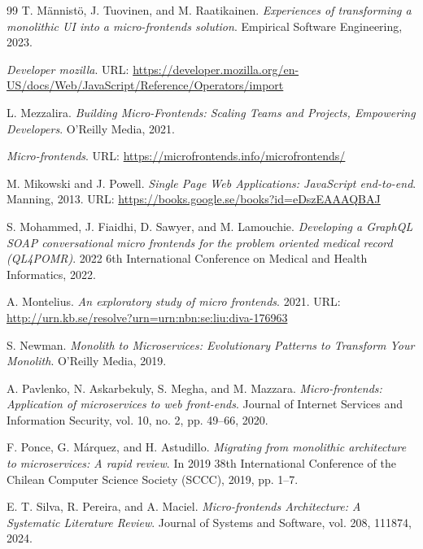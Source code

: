 \begin{thebibliography}{99}
    T. Männistö, J. Tuovinen, and M. Raatikainen.
    \textit{Experiences of transforming a monolithic UI into a micro-frontends solution}.
    Empirical Software Engineering, 2023.

    \textit{Developer mozilla}.
    URL: \url{https://developer.mozilla.org/en-US/docs/Web/JavaScript/Reference/Operators/import}

    L. Mezzalira.
    \textit{Building Micro-Frontends: Scaling Teams and Projects, Empowering Developers}.
    O'Reilly Media, 2021.

    \textit{Micro-frontends}.
    URL: \url{https://microfrontends.info/microfrontends/}

    M. Mikowski and J. Powell.
    \textit{Single Page Web Applications: JavaScript end-to-end}.
    Manning, 2013.
    URL: \url{https://books.google.se/books?id=eDszEAAAQBAJ}

    S. Mohammed, J. Fiaidhi, D. Sawyer, and M. Lamouchie.
    \textit{Developing a GraphQL SOAP conversational micro frontends for the problem oriented medical record (QL4POMR)}.
    2022 6th International Conference on Medical and Health Informatics, 2022.

    A. Montelius.
    \textit{An exploratory study of micro frontends}.
    2021.
    URL: \url{http://urn.kb.se/resolve?urn=urn:nbn:se:liu:diva-176963}

    S. Newman.
    \textit{Monolith to Microservices: Evolutionary Patterns to Transform Your Monolith}.
    O'Reilly Media, 2019.

    A. Pavlenko, N. Askarbekuly, S. Megha, and M. Mazzara.
    \textit{Micro-frontends: Application of microservices to web front-ends}.
    Journal of Internet Services and Information Security, vol. 10, no. 2, pp. 49–66, 2020.

    F. Ponce, G. Márquez, and H. Astudillo.
    \textit{Migrating from monolithic architecture to microservices: A rapid review}.
    In 2019 38th International Conference of the Chilean Computer Science Society (SCCC), 2019, pp. 1–7.

    E. T. Silva, R. Pereira, and A. Maciel.
    \textit{Micro-frontends Architecture: A Systematic Literature Review}.
    Journal of Systems and Software, vol. 208, 111874, 2024.


\end{thebibliography}
